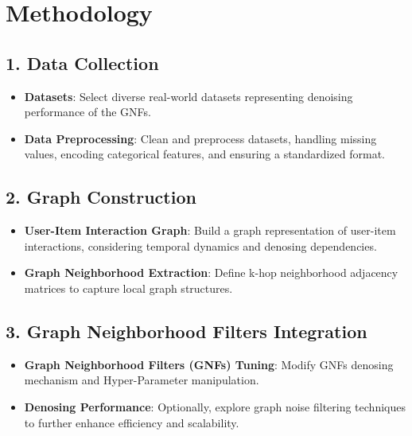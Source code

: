 \documentclass[journal]{IEEEtran}
\begin{document}

\section{Methodology}

\subsection*{1. Data Collection}

\begin{itemize}
  \item \textbf{Datasets}: Select diverse real-world datasets representing denoising performance of the GNFs.
  \item \textbf{Data Preprocessing}: Clean and preprocess datasets, handling missing values, encoding categorical features, and ensuring a standardized format.
\end{itemize}

\subsection*{2. Graph Construction}

\begin{itemize}
  \item \textbf{User-Item Interaction Graph}: Build a graph representation of user-item interactions, considering temporal dynamics and denosing dependencies.
  \item \textbf{Graph Neighborhood Extraction}: Define k-hop neighborhood adjacency matrices to capture local graph structures.
\end{itemize}

\subsection*{3. Graph Neighborhood Filters Integration}

\begin{itemize}
  \item \textbf{Graph Neighborhood Filters (GNFs) Tuning}: Modify GNFs denosing mechanism and Hyper-Parameter manipulation.
  \item \textbf{Denosing Performance}: Optionally, explore graph noise filtering techniques to further enhance efficiency and scalability.
\end{itemize}
\end{document}
